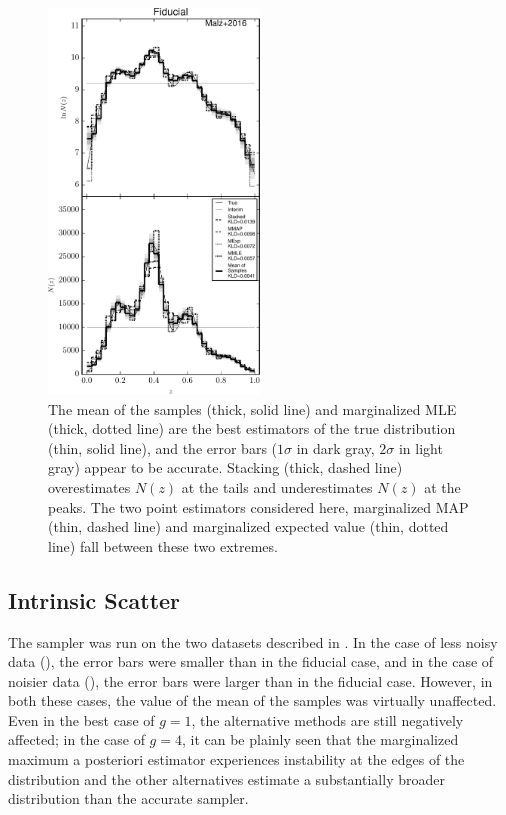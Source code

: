 \begin{figure}
	\includegraphics[width=0.5\textwidth]{figures/chippr/null_comps.pdf}
	\caption{The mean of the samples (thick, solid line) and marginalized MLE (thick, dotted line) are the best estimators of the true distribution (thin, solid line), and the error bars ($1\sigma$ in dark gray, $2\sigma$ in light gray) appear to be accurate.  
		Stacking (thick, dashed line) overestimates $N(z)$ at the tails and underestimates $N(z)$ at the peaks.  
		The two point estimators considered here, marginalized MAP (thin, dashed line) and marginalized expected value (thin, dotted line) fall between these two 
		extremes.}
\end{figure}

\subsection{Intrinsic Scatter}

The sampler was run on the two datasets described in .  
In the case of less noisy data (), the error bars were smaller than in the fiducial case, and in the case of noisier data (), the error bars were larger than in the fiducial case.  
However, in both these cases, the value of the mean of the samples was virtually unaffected.  
Even in the best case of $g=1$, the alternative methods are still negatively affected; in the case of $g=4$, it can be plainly seen that the marginalized maximum a posteriori estimator experiences instability at the edges of the distribution and the other alternatives estimate a substantially broader distribution than the accurate sampler.

